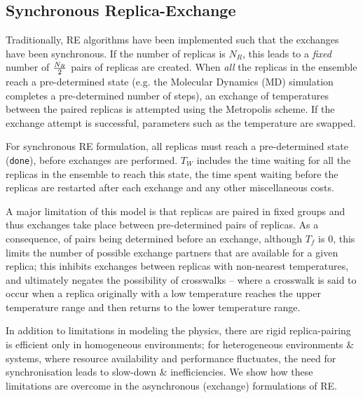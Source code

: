 \documentclass{rspublic}
\begin{document}

\subsection{Synchronous Replica-Exchange}

Traditionally, RE algorithms have been implemented such that the
exchanges have been synchronous.  If the number of replicas is
${N_R}$, this leads to a {\it fixed} number of ${N_R \over 2}$ pairs
of replicas are created.  When \emph{all} the replicas in the ensemble
reach a pre-determined state (e.g. the Molecular Dynamics (MD)
simulation completes a pre-determined number of steps), an exchange of
temperatures between the paired replicas is attempted using the
Metropolis scheme.  If the exchange attempt is successful, parameters
such as the temperature are swapped.


For synchronous RE formulation, all replicas must reach a
pre-determined state (\texttt{done}), before exchanges are performed.
$T_W$ includes the time waiting for all the replicas in the ensemble
to reach this state, the time spent waiting before the replicas are
restarted after each exchange and any other miscellaneous costs.

A major limitation of this model is that replicas are paired in fixed
groups and thus exchanges take place between pre-determined pairs of
replicas.  As a consequence, of pairs being determined before an
exchange, although $T_f$ is $0$, this limits the number of possible
exchange partners that are available for a given replica; this
inhibits exchanges between replicas with non-nearest temperatures, and
ultimately negates the possibility of crosswalks -- where a crosswalk
is said to occur when a replica originally with a low temperature
reaches the upper temperature range and then returns to the lower
temperature range.

In addition to limitations in modeling the physics, there are rigid
replica-pairing is efficient only in homogeneous environments; for
heterogeneous environments \& systems, where resource availability and
performance fluctuates, the need for synchronisation leads to
slow-down \& inefficiencies. We show how these limitations are
overcome in the asynchronous (exchange) formulations of RE.
\end{document}
